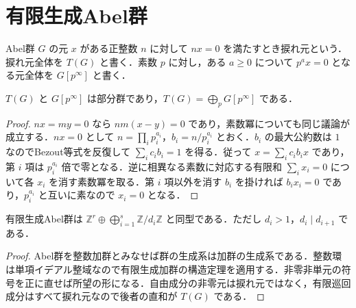 \section{有限生成Abel群}
\begin{defn}[捩れ部分群]
Abel群 $G$ の元 $x$ がある正整数 $n$ に対して $nx=0$ を満たすとき捩れ元という．捩れ元全体を $T(G)$ と書く．素数 $p$ に対し，ある $a\geq0$ について $p^ax=0$ となる元全体を $G[p^\infty]$ と書く．
\end{defn}
\begin{prop}[素数成分への分解]
$T(G)$ と $G[p^\infty]$ は部分群であり，$T(G)=\bigoplus_p G[p^\infty]$ である．
\end{prop}
\begin{proof}
$nx=my=0$ なら $nm(x-y)=0$ であり，素数冪についても同じ議論が成立する．$nx=0$ として $n=\prod_i p_i^{a_i}$，$b_i=n/p_i^{a_i}$ とおく．$b_i$ の最大公約数は $1$ なのでBezout等式を反復して $\sum_i c_i b_i=1$ を得る．従って $x=\sum_i c_i b_i x$ であり，第 $i$ 項は $p_i^{a_i}$ 倍で零となる．逆に相異なる素数に対応する有限和 $\sum_i x_i=0$ について各 $x_i$ を消す素数冪を取る．第 $i$ 項以外を消す $b_i$ を掛ければ $b_ix_i=0$ であり，$p_i^{a_i}$ と互いに素なので $x_i=0$ となる．
\end{proof}
\begin{prop}[有限生成Abel群の構造定理]
有限生成Abel群は $\mathbb Z^r\oplus\bigoplus_{i=1}^s\mathbb Z/d_i\mathbb Z$ と同型である．ただし $d_i>1$，$d_i\mid d_{i+1}$ である．
\end{prop}
\begin{proof}
Abel群を整数加群とみなせば群の生成系は加群の生成系である．整数環は単項イデアル整域なので有限生成加群の構造定理を適用する．非零非単元の符号を正に直せば所望の形になる．自由成分の非零元は捩れ元ではなく，有限巡回成分はすべて捩れ元なので後者の直和が $T(G)$ である．
\end{proof}
